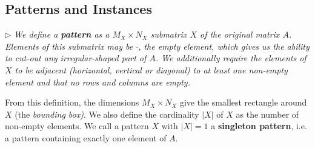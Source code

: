 \documentclass{llncs}
\begin{document}



\subsection{Patterns and Instances}
\noindent $\triangleright$ \emph{We define a \textbf{pattern} as a $M_X\times N_X$ submatrix $X$ of the original matrix $A$. Elements of this submatrix may be $\cdot$, the empty element, which gives us the ability to cut-out any irregular-shaped part of $A$. We additionally require the elements of $X$ to be adjacent (horizontal, vertical or diagonal) to at least one non-empty element and that no rows and columns are empty.}

\smallskip

From this definition, the dimensions $M_X\times N_X$ give the smallest rectangle around $X$ (the \emph{bounding box)}. We also define the cardinality $|X|$ of $X$ as the number of non-empty elements. We call a pattern $X$ with $|X|=1$ a \textbf{singleton pattern}, i.e. a pattern containing exactly one element of $A$. %
\end{document}
